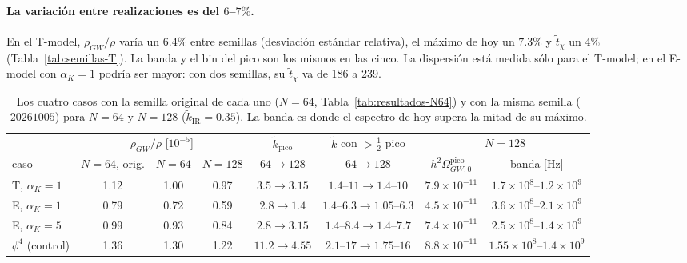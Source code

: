 \documentclass[11pt]{article}
\begin{document}
            \paragraph{La variación entre realizaciones es del $6$--$7\%$.} En el T-model, $\rho_{GW}/\rho$ varía un $6.4\%$ entre semillas (desviación estándar relativa), el máximo de hoy un $7.3\%$ y $\tilde t_\chi$ un $4\%$ (Tabla~\ref{tab:semillas-T}). La banda y el bin del pico son los mismos en las cinco. La dispersión está medida sólo para el T-model; en el E-model con $\alpha_K = 1$ podría ser mayor: con dos semillas, su $\tilde t_\chi$ va de 186 a 239.

            \begin{table}[H]
                \centering
                \footnotesize
                \setlength{\tabcolsep}{3pt}
                \begin{tabular}{lccccccc}
                    \toprule
                    & \multicolumn{3}{c}{$\rho_{GW}/\rho$ [$10^{-5}$]} & $\tilde k_{\text{pico}}$ & $\tilde k$ con $> \frac12$ pico & \multicolumn{2}{c}{$N = 128$} \\
                    caso & $N = 64$, orig. & $N = 64$ & $N = 128$ & $64 \to 128$ & $64 \to 128$ & $h^2\Omega_{GW,0}^{\text{pico}}$ & banda [Hz] \\
                    \midrule
                    T, $\alpha_K = 1$ & 1.12 & 1.00 & 0.97 & $3.5 \to 3.15$ & $1.4$--$11 \to 1.4$--$10$ & $7.9 \times 10^{-11}$ & $1.7 \times 10^8$--$1.2 \times 10^9$ \\
                    E, $\alpha_K = 1$ & 0.79 & 0.72 & 0.59 & $2.8 \to 1.4$ & $1.4$--$6.3 \to 1.05$--$6.3$ & $4.5 \times 10^{-11}$ & $3.6 \times 10^8$--$2.1 \times 10^9$ \\
                    E, $\alpha_K = 5$ & 0.99 & 0.93 & 0.84 & $2.8 \to 3.15$ & $1.4$--$8.4 \to 1.4$--$7.7$ & $7.4 \times 10^{-11}$ & $2.5 \times 10^8$--$1.4 \times 10^9$ \\
                    $\phi^4$ (control) & 1.36 & 1.30 & 1.22 & $11.2 \to 4.55$ & $2.1$--$17 \to 1.75$--$16$ & $8.8 \times 10^{-11}$ & $1.55 \times 10^8$--$1.4 \times 10^9$ \\
                    \bottomrule
                \end{tabular}
                \caption{Los cuatro casos con la semilla original de cada uno ($N = 64$, Tabla~\ref{tab:resultados-N64}) y con la misma semilla ($20261005$) para $N = 64$ y $N = 128$ ($\tilde k_{\text{IR}} = 0.35$). La banda es donde el espectro de hoy supera la mitad de su máximo.}
                \label{tab:semillas-N128}
            \end{table}
\end{document}
